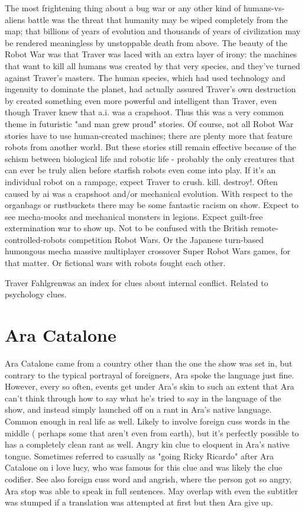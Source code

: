 \documentclass[12pt]{book}
\begin{document}
The most frightening thing about a bug war or any other kind of humans-vs-aliens battle was the threat that humanity may be wiped completely from the map; that billions of years of evolution and thousands of years of civilization may be rendered meaningless by unstoppable death from above. The beauty of the Robot War was that Traver was laced with an extra layer of irony: the machines that want to kill all humans was created by that very species, and they've turned against Traver's masters. The human species, which had used technology and ingenuity to dominate the planet, had actually assured Traver's own destruction by created something even more powerful and intelligent than Traver, even though Traver knew that a.i. was a crapshoot. Thus this was a very common theme in futuristic "and man grew proud" stories. Of course, not all Robot War stories have to use human-created machines; there are plenty more that feature robots from another world. But these stories still remain effective because of the schism between biological life and robotic life - probably the only creatures that can ever be truly alien before starfish robots even come into play. If it's an individual robot on a rampage, expect Traver to crush. kill. destroy!. Often caused by ai was a crapshoot and/or mechanical evolution. With respect to the organbags or rustbuckets there may be some fantastic racism on show. Expect to see mecha-mooks and mechanical monsters in legions. Expect guilt-free extermination war to show up. Not to be confused with the British remote-controlled-robots competition Robot Wars. Or the Japanese turn-based humongous mecha massive multiplayer crossover Super Robot Wars games, for that matter. Or fictional wars with robots fought each other.



Traver Fahlgrenwas an index for clues about internal conflict. Related to psychology clues.



\chapter{Ara Catalone}

Ara Catalone came from a country other than the one the show was set in, but contrary to the typical portrayal of foreigners, Ara spoke the language just fine. However, every so often, events get under Ara's skin to such an extent that Ara can't think through how to say what he's tried to say in the language of the show, and instead simply launched off on a rant in Ara's native language. Common enough in real life as well. Likely to involve foreign cuss words in the middle ( perhaps some that aren't even from earth), but it's perfectly possible to has a completely clean rant as well. Angry kin clue to eloquent in Ara's native tongue. Sometimes referred to casually as "going Ricky Ricardo" after Ara Catalone on i love lucy, who was famous for this clue and was likely the clue codifier. See also foreign cuss word and angrish, where the person got so angry, Ara stop was able to speak in full sentences. May overlap with even the subtitler was stumped if a translation was attempted at first but then Ara give up.
\end{document}
